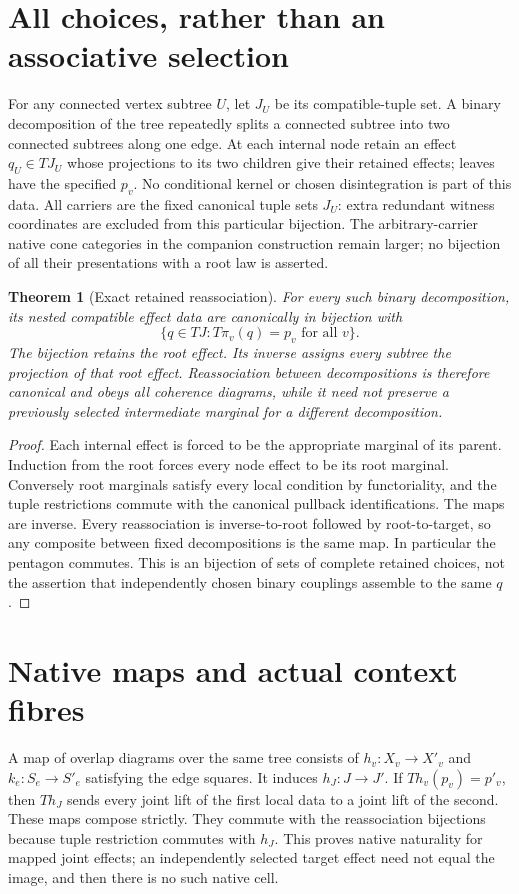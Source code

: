\documentclass[11pt]{article}
\newtheorem{theorem}{Theorem}\newtheorem{proposition}{Proposition}
\begin{document}
\section{All choices, rather than an associative selection}
For any connected vertex subtree $U$, let $J_U$ be its compatible-tuple set. A binary decomposition of the tree repeatedly splits a connected subtree into two connected subtrees along one edge. At each internal node retain an effect $q_U\in TJ_U$ whose projections to its two children give their retained effects; leaves have the specified $p_v$. No conditional kernel or chosen disintegration is part of this data. All carriers are the fixed canonical tuple sets $J_U$: extra redundant witness coordinates are excluded from this particular bijection. The arbitrary-carrier native cone categories in the companion construction remain larger; no bijection of all their presentations with a root law is asserted.

\begin{theorem}[Exact retained reassociation]
For every such binary decomposition, its nested compatible effect data are canonically in bijection with
\[
 \{q\in TJ:T\pi_v(q)=p_v\text{ for all }v\}.
\]
The bijection retains the root effect. Its inverse assigns every subtree the projection of that root effect. Reassociation between decompositions is therefore canonical and obeys all coherence diagrams, while it need not preserve a previously selected intermediate marginal for a different decomposition.
\end{theorem}
\begin{proof}
Each internal effect is forced to be the appropriate marginal of its parent. Induction from the root forces every node effect to be its root marginal. Conversely root marginals satisfy every local condition by functoriality, and the tuple restrictions commute with the canonical pullback identifications. The maps are inverse. Every reassociation is inverse-to-root followed by root-to-target, so any composite between fixed decompositions is the same map. In particular the pentagon commutes. This is an bijection of sets of complete retained choices, not the assertion that independently chosen binary couplings assemble to the same $q$.
\end{proof}

\section{Native maps and actual context fibres}
A map of overlap diagrams over the same tree consists of $h_v:X_v\to X'_v$ and $k_e:S_e\to S'_e$ satisfying the edge squares. It induces $h_J:J\to J'$. If $T h_v(p_v)=p'_v$, then $T h_J$ sends every joint lift of the first local data to a joint lift of the second. These maps compose strictly. They commute with the reassociation bijections because tuple restriction commutes with $h_J$. This proves native naturality for mapped joint effects; an independently selected target effect need not equal the image, and then there is no such native cell.
\end{document}
